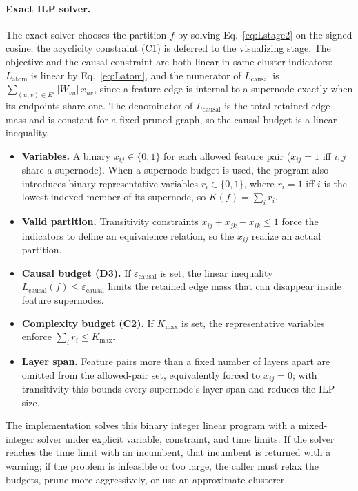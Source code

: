 \documentclass[../main.tex]{subfiles}
\begin{document}
\paragraph{Exact ILP solver.}
The exact solver chooses the partition $f$ by solving Eq.~\eqref{eq:Lstage2} on the
signed cosine; the acyclicity constraint (C1) is deferred to the visualizing stage.
The objective and the causal constraint are both linear in same-cluster indicators:
$L_{\text{atom}}$ is linear by Eq.~\eqref{eq:Latom}, and the numerator of
$L_{\text{causal}}$ is
$\sum_{(u, v) \in E'} |W_{vu}|\, x_{uv}$, since a feature edge is internal to a
supernode exactly when its endpoints share one. The denominator of
$L_{\text{causal}}$ is the total retained edge mass and is constant for a fixed
pruned graph, so the causal budget is a linear inequality.
\begin{itemize}[leftmargin=*,topsep=2pt,itemsep=1pt]
\item \textbf{Variables.} A binary $x_{ij} \in \{0, 1\}$ for each allowed feature
pair ($x_{ij} = 1$ iff $i, j$ share a supernode). When a supernode budget is used,
the program also introduces binary representative variables $r_i \in \{0, 1\}$,
where $r_i = 1$ iff $i$ is the lowest-indexed member of its supernode, so
$K(f) = \sum_i r_i$.
\item \textbf{Valid partition.} Transitivity constraints
$x_{ij} + x_{jk} - x_{ik} \le 1$ force the indicators to define an equivalence
relation, so the $x_{ij}$ realize an actual partition.
\item \textbf{Causal budget (D3).} If $\varepsilon_{\text{causal}}$ is set, the
linear inequality $L_{\text{causal}}(f) \le \varepsilon_{\text{causal}}$ limits
the retained edge mass that can disappear inside feature supernodes.
\item \textbf{Complexity budget (C2).} If $K_{\max}$ is set, the representative
variables enforce $\sum_i r_i \le K_{\max}$.
\item \textbf{Layer span.} Feature pairs more than a fixed number of layers apart
are omitted from the allowed-pair set, equivalently forced to $x_{ij} = 0$; with
transitivity this bounds every supernode's layer span and reduces the ILP size.
\end{itemize}
The implementation solves this binary integer linear program with a mixed-integer
solver under explicit variable, constraint, and time limits. If the solver reaches
the time limit with an incumbent, that incumbent is returned with a warning; if the
problem is infeasible or too large, the caller must relax the budgets, prune more
aggressively, or use an approximate clusterer.
\end{document}
